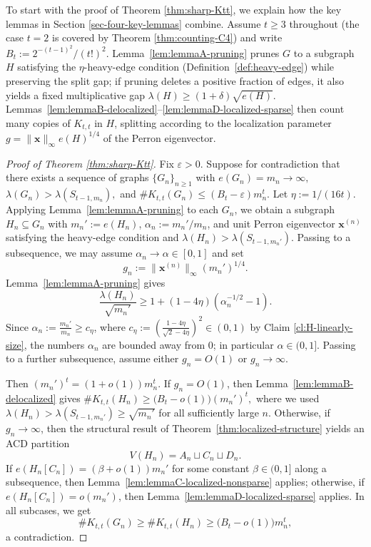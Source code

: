 \documentclass[10pt,a4paper]{amsart}
\newcommand{\Ktt}{K_{t,t}}
\begin{document}
To start with the proof of Theorem \ref{thm:sharp-Ktt}, we explain how the key lemmas in Section \ref{sec-four-key-lemmas} combine.
Assume $t\ge 3$ throughout (the case $t=2$ is covered by Theorem \ref{thm:counting-C4}) and write
$B_t:=2^{-(t-1)^2}/(t!)^2$.
Lemma~\ref{lem:lemmaA-pruning} prunes $G$ to a subgraph $H$ satisfying the $\eta$-heavy-edge condition
(Definition~\ref{def:heavy-edge}) while preserving the split gap; if pruning deletes a positive fraction of edges, it also yields a fixed
multiplicative gap $\lambda(H)\ge (1+\delta)\sqrt{e(H)}$.
Lemmas~\ref{lem:lemmaB-delocalized}--\ref{lem:lemmaD-localized-sparse} then count many copies of $\Ktt$ in $H$, splitting according to the
localization parameter $g =\|\bm{x}\|_\infty e(H)^{1/4}$ of the Perron eigenvector.

\begin{proof}[Proof of Theorem \ref{thm:sharp-Ktt}]
Fix \(\varepsilon>0\). Suppose for contradiction that there exists a sequence of graphs \(\{G_n\}_{n\ge1}\) with $e(G_n)=m_n\to\infty,$ $\lambda(G_n)>\lambda(S_{t-1,m_n}),$
and $\texttt{\#}\Ktt(G_n)\le (B_t-\varepsilon)m_n^t.$
Let \(\eta:=1/(16t)\).
Applying Lemma~\ref{lem:lemmaA-pruning} to each \(G_n\), we obtain a subgraph $H_n\subseteq G_n$ with $m_n':=e(H_n)$,
$\alpha_n:=m_n'/m_n$, and unit Perron eigenvector $\bm{x}^{(n)}$ satisfying the heavy-edge condition and
$\lambda(H_n)>\lambda(S_{t-1,m_n'})$. 
Passing to a subsequence, we may assume $\alpha_n\to\alpha\in[0,1]$ and set
\[
        g_n:=\|\bm{x}^{(n)}\|_\infty(m_n')^{1/4}.
\]
Lemma~\ref{lem:lemmaA-pruning} gives
\[
        \frac{\lambda(H_n)}{\sqrt{m_n'}}
        \ge
        1+(1-4\eta)(\alpha_n^{-1/2}-1).
\]
Since $\alpha_n := \frac{m_n'}{m_n} \ge c_{\eta} $, where $c_{\eta}:=\left(\frac{1-4\eta}{\sqrt{2}-4\eta}\right)^2\in(0,1)$
by Claim \ref{cl:H-linearly-size}, the numbers $\alpha_n$ are bounded away from $0$; in particular
$\alpha\in(0,1]$.
Passing to a further subsequence, assume either $g_n=O(1)$ or $g_n\to\infty$.

\smallskip

Then $(m_n')^t=(1+o(1))m_n^t$.
If $g_n=O(1)$, then Lemma~\ref{lem:lemmaB-delocalized} gives
$\texttt{\#}\Ktt(H_n)
        \ge
        \bigl(B_t-o(1)\bigr)(m_n')^t,$
where we used $\lambda(H_n)>\lambda(S_{t-1,m_n'})\ge \sqrt{m_n'}$ for all sufficiently large \(n\).
Otherwise, if $g_n\to\infty$, then the structural result of Theorem~\ref{thm:localized-structure} yields an ACD partition
\[
        V(H_n)=A_n\sqcup C_n\sqcup D_n.
\]
If $e(H_n[C_n])=(\beta+o(1))m_n'$ for some constant $\beta\in(0,1]$ along a subsequence, then
Lemma~\ref{lem:lemmaC-localized-nonsparse}  applies; otherwise, if $e(H_n[C_n])=o(m_n')$, then 
Lemma~\ref{lem:lemmaD-localized-sparse} applies.
In all subcases, we get
\[
    \texttt{\#}\Ktt(G_n)
        \ge
        \texttt{\#}\Ktt(H_n)
        \ge
        \bigl(B_t-o(1)\bigr)m_n^t,
\]
a contradiction.


\end{proof}
\end{document}
